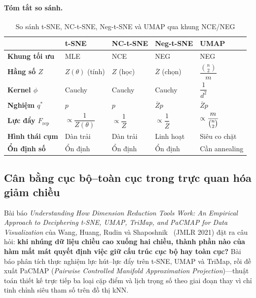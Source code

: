 \paragraph{Tóm tắt so sánh.}
\begin{table}[H]
\centering
\caption{So sánh t-SNE, NC-t-SNE, Neg-t-SNE và UMAP qua khung NCE/NEG}
\label{tab:dr-compare-ch4}
\begin{tabular}{@{}lllll@{}}
\toprule
 & \textbf{t-SNE} & \textbf{NC-t-SNE} & \textbf{Neg-t-SNE} & \textbf{UMAP} \\
\midrule
\textbf{Khung tối ưu}          & MLE          & NCE           & NEG           & NEG \\
\textbf{Hằng số $Z$}           & $Z(\theta)$ (tính) & $Z$ (học) & $\overline{Z}$ (chọn) & $\dfrac{\binom{n}{2}}{m}$ \\
\textbf{Kernel $\phi$}         & Cauchy       & Cauchy        & Cauchy        & $\dfrac{1}{d^2}$ \\
\textbf{Nghiệm $q^*$}          & $p$          & $p$           & $\overline{Z}p$ & $\overline{Z}p$ \\
\textbf{Lực đẩy $F_{\text{rep}}$} & $\propto \dfrac{1}{Z(\theta)}$ & $\propto \dfrac{1}{Z}$ & $\propto \dfrac{1}{\overline{Z}}$ & $\propto \dfrac{m}{\tbinom{n}{2}}$ \\
\textbf{Hình thái cụm}         & Dàn trải     & Dàn trải      & Linh hoạt     & Siêu co chặt \\
\textbf{Ổn định số}            & Ổn định      & Ổn định       & Ổn định       & Cần annealing \\
\bottomrule
\end{tabular}
\end{table}

\subsection{Cân bằng cục bộ--toàn cục trong trực quan hóa giảm chiều}
\label{sec:research-pacmap}

Bài báo \emph{Understanding How Dimension Reduction Tools Work: An Empirical Approach to Deciphering t-SNE, UMAP, TriMap, and PaCMAP for Data Visualization} của Wang, Huang, Rudin và Shaposhnik~\cite{wang2021pacmap} (JMLR 2021) đặt ra câu hỏi: \textbf{khi nhúng dữ liệu chiều cao xuống hai chiều, thành phần nào của hàm mất mát quyết định việc giữ cấu trúc cục bộ hay toàn cục?} Bài báo phân tích thực nghiệm lực hút--lực đẩy trên t-SNE, UMAP và TriMap, rồi đề xuất PaCMAP (\textit{Pairwise Controlled Manifold Approximation Projection})---thuật toán thiết kế trực tiếp ba loại cặp điểm và lịch trọng số theo giai đoạn thay vì chỉ tinh chỉnh siêu tham số trên đồ thị kNN.

